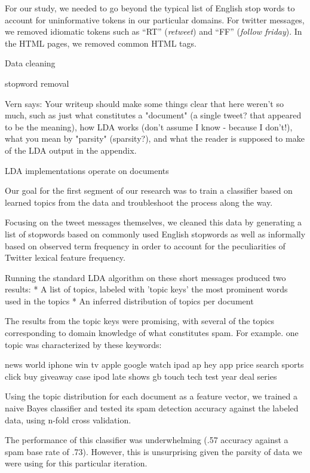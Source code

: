 \documentclass[times, 11pt, twocolumn]{article}
\begin{document}
For our study, we needed to go beyond the typical list of English stop words to account for uninformative tokens in our particular domains.
For twitter messages, we removed idiomatic tokens such as ``RT'' (\emph{retweet}) and ``FF'' (\emph{follow friday}).
In the HTML pages, we removed common HTML tags.


Data cleaning 

stopword removal



Vern says: Your writeup should make some things clear that here weren't so much, such as just what constitutes a "document" (a single tweet? that appeared to be the meaning), how LDA works (don't assume I know - because I don't!), what you mean by "parsity" (sparsity?), and what the reader is supposed to make of the      LDA output in the appendix.

LDA implementations operate on documents


Our  goal for the first segment of our research was to train a classifier  based on learned topics from the data and troubleshoot the process along  the way.

Focusing on the tweet messages themselves, we cleaned this data by generating a list of stopwords based on commonly used English stopwords as well as informally based on observed term frequency in order to account for the peculiarities of Twitter lexical feature frequency.

Running the standard LDA algorithm on these short messages produced two results:
	* A list of topics, labeled with 'topic keys'  the most prominent words used in the topics
	* An inferred distribution of topics per document
    
The results from the topic keys were promising, with several of the topics corresponding to domain knowledge of what constitutes spam.  For example. one topic was characterized by these keywords:

news world iphone win tv apple google watch ipad ap hey  app price search sports click buy giveaway case ipod late shows gb touch  tech test year deal series 

Using the topic distribution for each document as a feature vector, we trained a naive Bayes classifier and tested its spam detection accuracy against the labeled data, using n-fold cross validation.

The performance of this classifier was underwhelming (.57 accuracy against a spam base rate of .73).  However, this is unsurprising given the parsity of data we were using for this particular iteration.
\end{document}
